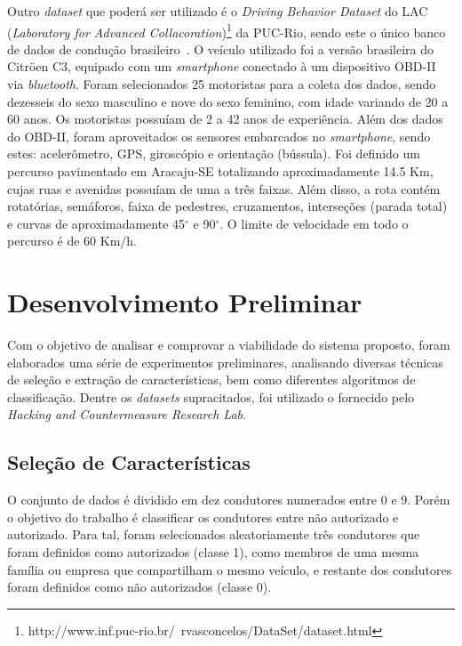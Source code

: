 Outro \textit{dataset} que poderá ser utilizado é o \textit{Driving Behavior Dataset} do LAC (\textit{Laboratory for Advanced Collacoration})\footnote[1]{http://www.inf.puc-rio.br/~rvasconcelos/DataSet/dataset.html} da PUC-Rio, sendo este o único banco de dados de condução brasileiro~\cite{OLIVEIRAVASCONCELOS2017}. O veículo utilizado foi a versão brasileira do Citröen C3, equipado com um \textit{smartphone} conectado à um dispositivo OBD-II via \textit{bluetooth}. Foram selecionados 25 motoristas para a coleta dos dados, sendo dezesseis  do sexo masculino e nove do sexo feminino, com idade variando de 20 a 60 anos. Os motoristas possuíam de 2 a 42 anos de experiência. Além dos dados do OBD-II, foram aproveitados os sensores embarcados no \textit{smartphone}, sendo estes: acelerômetro, GPS, giroscópio e orientação (bússula). Foi definido um percurso pavimentado em Aracaju-SE totalizando aproximadamente 14.5 Km, cujas ruas e avenidas possuíam de uma a três faixas. Além disso, a rota contém rotatórias, semáforos, faixa de pedestres, cruzamentos, interseções (parada total) e curvas de aproximadamente 45$^\circ$ e 90$^\circ$. O limite de velocidade em todo o percurso é de 60 Km/h.

\section{Desenvolvimento Preliminar}

Com o objetivo de analisar e comprovar a viabilidade do sistema proposto, foram elaborados uma série de experimentos preliminares, analisando diversas técnicas de seleção e extração de características, bem como diferentes algoritmos de classificação. Dentre os \textit{datasets} supracitados, foi utilizado o fornecido pelo \textit{Hacking and Countermeasure Research Lab}.

\subsection{Seleção de Características}

O conjunto de dados é dividido em dez condutores numerados entre 0 e 9. Porém o objetivo do trabalho é classificar os condutores entre não autorizado e autorizado. Para tal, foram selecionados aleatoriamente três condutores que foram definidos como autorizados (classe 1), como membros de uma mesma família ou empresa que compartilham o mesmo veículo, e restante dos condutores foram definidos como não autorizados (classe 0). 

